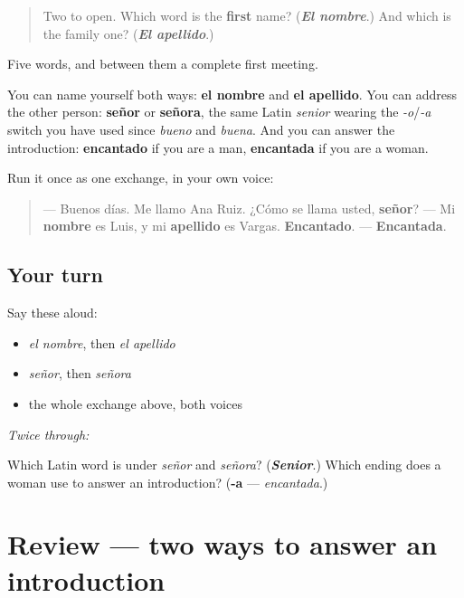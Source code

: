 \label{lesson:ES-C319-repaso-presentarse}



\begin{quote}
Two to open. Which word is the \textbf{first} name? (\emph{\textbf{El nombre}}.) And which is the family one? (\emph{\textbf{El apellido}}.)
\end{quote}

\begin{grammarlens}[title={What you've built}]
Five words, and between them a complete first meeting.

You can name yourself both ways: \textbf{el nombre} and \textbf{el apellido}. You can address the other person: \textbf{señor} or \textbf{señora}, the same Latin \emph{senior} wearing the \emph{-o}/\emph{-a} switch you have used since \emph{bueno} and \emph{buena}. And you can answer the introduction: \textbf{encantado} if you are a man, \textbf{encantada} if you are a woman.

Run it once as one exchange, in your own voice:

\begin{quote}
— Buenos días. Me llamo Ana Ruiz. ¿Cómo se llama usted, \textbf{señor}? — Mi \textbf{nombre} es Luis, y mi \textbf{apellido} es Vargas. \textbf{Encantado}. — \textbf{Encantada}.
\end{quote}
\end{grammarlens}

\subsection*{Your turn}
Say these aloud:

\begin{itemize}
\raggedright
  \item \emph{el nombre}, then \emph{el apellido}
  \item \emph{señor}, then \emph{señora}
  \item the whole exchange above, both voices
\end{itemize}

\emph{Twice through:}

\begin{tcolorbox}[breakable,colback=teal!4,colframe=teal!35!black,title={Before you move on}]
Which Latin word is under \emph{señor} and \emph{señora}? (\emph{\textbf{Senior}}.) Which ending does a woman use to answer an introduction? (\textbf{-a} — \emph{encantada}.)
\end{tcolorbox}
\section[(review)]{Review — two ways to answer an introduction}

